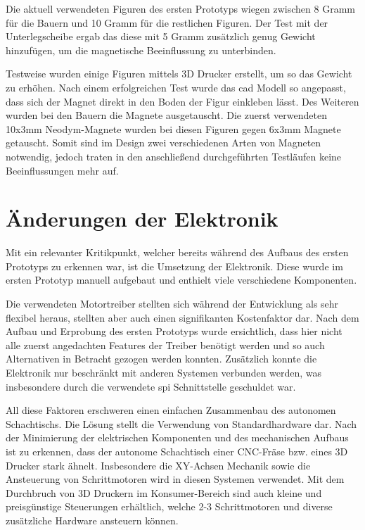 Die aktuell verwendeten Figuren des ersten Prototyps wiegen zwischen 8
Gramm für die Bauern und 10 Gramm für die restlichen Figuren. Der Test
mit der Unterlegscheibe ergab das diese mit 5 Gramm zusätzlich genug
Gewicht hinzufügen, um die magnetische Beeinflussung zu unterbinden.

Testweise wurden einige Figuren mittels 3D Drucker erstellt, um so das
Gewicht zu erhöhen. Nach einem erfolgreichen Test wurde das \gls{cad}
Modell so angepasst, dass sich der Magnet direkt in den Boden der Figur
einkleben lässt. Des Weiteren wurden bei den Bauern die Magnete
ausgetauscht. Die zuerst verwendeten 10x3mm Neodym-Magnete wurden bei
diesen Figuren gegen 6x3mm Magnete getauscht. Somit sind im Design zwei
verschiedenen Arten von Magneten notwendig, jedoch traten in den
anschließend durchgeführten Testläufen keine Beeinflussungen mehr auf.

\hypertarget{uxe4nderungen-der-elektronik}{%
\section{Änderungen der Elektronik}\label{uxe4nderungen-der-elektronik}}

Mit ein relevanter Kritikpunkt, welcher bereits während des Aufbaus des
ersten Prototyps zu erkennen war, ist die Umsetzung der Elektronik.
Diese wurde im ersten Prototyp manuell aufgebaut und enthielt viele
verschiedene Komponenten.

Die verwendeten Motortreiber stellten sich während der Entwicklung als
sehr flexibel heraus, stellten aber auch einen signifikanten
Kostenfaktor dar. Nach dem Aufbau und Erprobung des ersten Prototyps
wurde ersichtlich, dass hier nicht alle zuerst angedachten Features der
Treiber benötigt werden und so auch Alternativen in Betracht gezogen
werden konnten. Zusätzlich konnte die Elektronik nur beschränkt mit
anderen Systemen verbunden werden, was insbesondere durch die verwendete
\gls{spi} Schnittstelle geschuldet war.

All diese Faktoren erschweren einen einfachen Zusammenbau des autonomen
Schachtischs. Die Lösung stellt die Verwendung von Standardhardware dar.
Nach der Minimierung der elektrischen Komponenten und des mechanischen
Aufbaus ist zu erkennen, dass der autonome Schachtisch einer CNC-Fräse
bzw. eines 3D Drucker stark ähnelt. Insbesondere die XY-Achsen Mechanik
sowie die Ansteuerung von Schrittmotoren wird in diesen Systemen
verwendet. Mit dem Durchbruch von 3D Druckern im Konsumer-Bereich sind
auch kleine und preisgünstige Steuerungen erhältlich, welche 2-3
Schrittmotoren und diverse zusätzliche Hardware ansteuern können.

